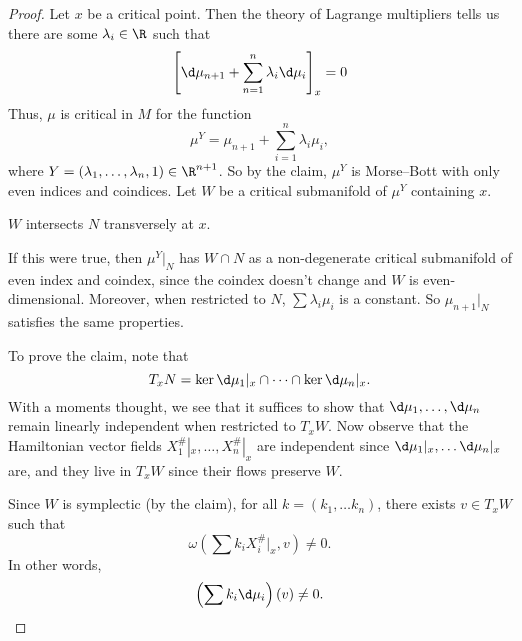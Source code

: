 \documentclass[a4paper]{article}
\begin{document}
\begin{proof}
  Let $x$ be a critical point. Then the theory of Lagrange multipliers tells us there are some $\lambda_i \in \R$ such that
  \[
    \left[\d \mu_{n + 1} + \sum_{n = 1}^n \lambda_i \d \mu_i\right]_x = 0
  \]
  Thus, $\mu$ is critical in $M$ for the function
  \[
    \mu^Y = \mu_{n + 1} + \sum_{i = 1}^n \lambda_i \mu_i,
  \]
  where $Y = (\lambda_1, \ldots, \lambda_n, 1) \in \R^{n + 1}$. So by the claim, $\mu^Y$ is Morse--Bott with only even indices and coindices. Let $W$ be a critical submanifold of $\mu^Y$ containing $x$.
  \begin{claim}
    $W$ intersects $N$ transversely at $x$.
  \end{claim}
  If this were true, then $\mu^Y|_N$ has $W \cap N$ as a non-degenerate critical submanifold of even index and coindex, since the coindex doesn't change and $W$ is even-dimensional. Moreover, when restricted to $N$, $\sum \lambda_i \mu_i$ is a constant. So $\mu_{n + 1}|_N$ satisfies the same properties.

  To prove the claim, note that
  \[
    T_x N = \ker \d \mu_1|_x \cap \cdots \cap \ker \d \mu_n|_x.
  \]
  With a moments thought, we see that it suffices to show that $\d \mu_1, \ldots, \d \mu_n$ remain linearly independent when restricted to $T_x W$. Now observe that the Hamiltonian vector fields $X_1^\#|_x, \ldots, X_n^\#|_x$ are independent since $\d \mu_1|_x, \ldots \d \mu_n|_x$ are, and they live in $T_x W$ since their flows preserve $W$.

  Since $W$ is symplectic (by the claim), for all $k = (k_1, \ldots k_n)$, there exists $v \in T_x W$ such that
  \[
    \omega \left(\sum k_i X_i^\#|_x, v\right) \not= 0.
  \]
  In other words,
  \[
    \left(\sum k_i \d \mu_i\right)(v) \not= 0.\qedhere
  \]
\end{proof}

%
%
\end{document}
